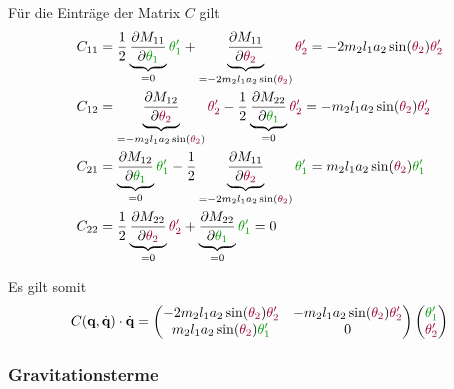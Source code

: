 \documentclass[a4paper, 12pt]{scrartcl}
\newcommand{\gruen}[2][gruen]{\textcolor{#1}{#2}}
\newcommand{\dunkelrot}[2][dunkelrot]{\textcolor{#1}{#2}}
\begin{document}
Für die Einträge der Matrix $C$ gilt
\begin{align*}
C_{11} 
&=
\frac{1}{2}  \underbrace{\frac{\partial M_{11}}{\partial \gruen{\theta_{1}}} }_{= 0} \gruen{\theta_{1}'} + \underbrace{\frac{\partial M_{11}}{\partial \dunkelrot{\theta_{2}}}}_{ =  -2m_2 l_1 a_2 \sin(\dunkelrot{\theta_2})} \dunkelrot{ \theta_{2}'}
=
-2m_2 l_1 a_2 \sin(\dunkelrot{\theta_2}) \dunkelrot{ \theta_{2}'} 
\\
C_{12}
&=
\underbrace{\frac{\partial M_{12}}{\partial \dunkelrot{\theta_{2}}}}_{= - m_2 l_1 a_2 \sin(\dunkelrot{\theta_2})} \dunkelrot{\theta_{2}'} - \frac{1}{2} \underbrace{\frac{\partial M_{22}}{\partial \gruen{\theta_{1}}}}_{ = 0} \dunkelrot{\theta_{2}'}
=
- m_2 l_1 a_2 \sin(\dunkelrot{\theta_2}) \dunkelrot{\theta_{2}'}
\\
C_{21} 
&= \underbrace{\frac{\partial M_{12}}{\partial \gruen{\theta_{1}}}}_{= 0} \gruen{\theta_{1}'} - \frac{1}{2} \underbrace{\frac{\partial M_{11}}{\partial \dunkelrot{\theta_{2}}}}_{= -2m_2 l_1 a_2 \sin(\dunkelrot{\theta_2}) } \gruen{\theta_{1}'}
=
m_2 l_1 a_2 \sin(\dunkelrot{\theta_2})\gruen{\theta_{1}'}
\\
C_{22} 
&=
\frac{1}{2} \underbrace{\frac{\partial M_{22}}{\partial \dunkelrot{\theta_{2}}}}_{ = 0} \dunkelrot{\theta_{2}'} + \underbrace{ \frac{\partial M_{22}}{\partial \gruen{\theta_{1}}}}_{ = 0} \gruen{\theta_{1}'}
= 0
\end{align*}

Es gilt somit 
\begin{align*}
C(\textbf{q}, \dot{\textbf{q}}) \cdot \dot{\textbf{q}}
=
\begin{pmatrix}
    -2m_2 l_1 a_2 \sin(\dunkelrot{\theta_2}) \dunkelrot{ \theta_{2}'} 
    &
    - m_2 l_1 a_2 \sin(\dunkelrot{\theta_2}) \dunkelrot{\theta_{2}'} 
    \\
    m_2 l_1 a_2 \sin(\dunkelrot{\theta_2})\gruen{\theta_{1}'}
    &
    0
\end{pmatrix}
\begin{pmatrix}
    \gruen{\theta_{1}'} \\
    \dunkelrot{\theta_{2}'} 
\end{pmatrix}
\end{align*}

\subsubsection{Gravitationsterme}
\end{document}
